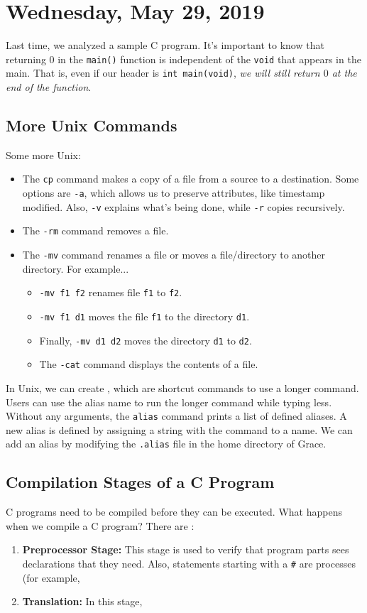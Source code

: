 \section{Wednesday, May 29, 2019}
Last time, we analyzed a sample C program. It's important to know that returning $0$ in the \verb!main()! function is independent of the \verb!void! that appears in the main. That is, even if our header is \verb!int main(void)!, \textit{we will still return $0$ at the end of the function}.

\subsection{More Unix Commands}
Some more Unix: \begin{itemize}
    \item The \verb!cp! command makes a copy of a file from a source to a destination. Some options are \verb!-a!, which allows us to preserve attributes, like timestamp modified. Also, \verb!-v! explains what's being done, while \verb!-r! copies recursively.   
    \item The \verb!-rm! command removes a file.
    \item The \verb!-mv! command renames a file or moves a file/directory to another directory. For example...
    \begin{itemize}
        \item \verb!-mv f1 f2! renames file \verb!f1! to \verb!f2!. 
        \item \verb!-mv f1 d1! moves the file \verb!f1! to the directory \verb!d1!.
        \item Finally, \verb!-mv d1 d2! moves the directory \verb!d1! to \verb!d2!.  
        \item The \verb!-cat! command displays the contents of a file.
    \end{itemize}
\end{itemize}
In Unix, we can create , which are shortcut commands to use a longer command. Users can use the alias name to run the longer command while typing less. Without any arguments, the \verb!alias! command prints a list of defined aliases. A new alias is defined by assigning a string with the command to a name. We can add an alias by modifying the \verb!.alias! file in the home directory of Grace.

\subsection{Compilation Stages of a C Program}
C programs need to be compiled before they can be executed. What happens when we compile a C program? There are : \begin{enumerate}
    \item \textbf{Preprocessor Stage:} This stage is used to verify that program parts sees declarations that they need. Also, statements starting with a \verb!#! are processes (for example, 
    \item \textbf{Translation:} In this stage, 
\end{enumerate}


